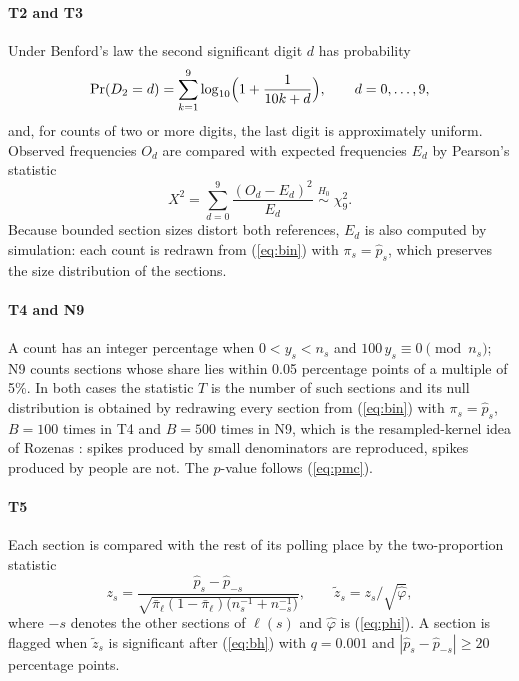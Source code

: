 \paragraph{T2 and T3} Under Benford's law the second significant digit $d$
has probability \cite{hill1995}
\begin{equation}
\Pr(D_2=d)=\sum_{k=1}^{9}\log_{10}\Bigl(1+\frac{1}{10k+d}\Bigr),\qquad d=0,\dots,9,
\label{eq:benford2}
\end{equation}
and, for counts of two or more digits, the last digit is approximately
uniform. Observed frequencies $O_d$ are compared with expected
frequencies $E_d$ by Pearson's statistic \cite{pearson1900}
\begin{equation}
X^2=\sum_{d=0}^{9}\frac{(O_d-E_d)^2}{E_d}\;\overset{H_0}{\sim}\;\chi^2_9.
\label{eq:chi2}
\end{equation}
Because bounded section sizes distort both references, $E_d$ is also
computed by simulation: each count is redrawn from (\ref{eq:bin}) with
$\pi_s=\hat p_s$, which preserves the size distribution of the sections.

\paragraph{T4 and N9} A count has an integer percentage when
$0<y_s<n_s$ and $100\,y_s\equiv0 \pmod{n_s}$; N9 counts sections whose
share lies within 0.05 percentage points of a multiple of 5\%. In both
cases the statistic $T$ is the number of such sections and its null
distribution is obtained by redrawing every section from
(\ref{eq:bin}) with $\pi_s=\hat p_s$, $B=100$ times in T4 and $B=500$ times
in N9, which is the resampled-kernel idea of Rozenas \cite{rozenas2017}:
spikes produced by small denominators are reproduced, spikes produced by
people are not. The $p$-value follows (\ref{eq:pmc}).

\paragraph{T5} Each section is compared with the rest of its polling place
by the two-proportion statistic
\begin{equation}
z_s=\frac{\hat p_s-\hat p_{-s}}{\sqrt{\bar\pi_\ell(1-\bar\pi_\ell)\bigl(n_s^{-1}+n_{-s}^{-1}\bigr)}},\qquad
\tilde z_s=z_s/\sqrt{\hat\varphi},
\label{eq:t5}
\end{equation}
where $-s$ denotes the other sections of $\ell(s)$ and $\hat\varphi$ is
(\ref{eq:phi}). A section is flagged when $\tilde z_s$ is significant after
(\ref{eq:bh}) with $q=0.001$ and $|\hat p_s-\hat p_{-s}|\geq20$
percentage points.

